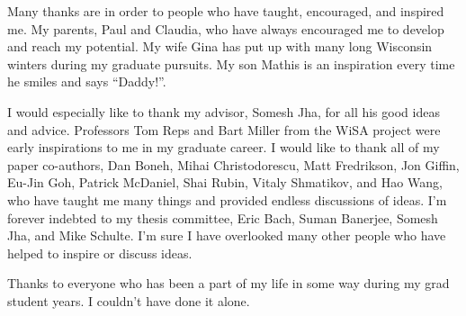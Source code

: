 
Many thanks are in order to people who have taught, encouraged, and
inspired me. My parents, Paul and Claudia, who have always encouraged
me to develop and reach my potential. My wife Gina has put up with
many long Wisconsin winters during my graduate pursuits. My son Mathis
is an inspiration every time he smiles and says {}``Daddy!''.

I would especially like to thank my advisor, Somesh Jha, for all his
good ideas and advice. Professors Tom Reps and Bart Miller from the
WiSA project were early inspirations to me in my graduate career.
I would like to thank all of my paper co-authors, Dan Boneh, Mihai
Christodorescu, Matt Fredrikson, Jon Giffin, Eu-Jin Goh, Patrick McDaniel,
Shai Rubin, Vitaly Shmatikov, and Hao Wang, who have taught
me many things and provided endless discussions of ideas. I'm forever indebted to
my thesis committee, Eric Bach, Suman Banerjee, Somesh Jha, and Mike
Schulte.  I'm sure I have overlooked many other people who have helped to inspire
or discuss ideas.

Thanks to everyone who has been a part of my life in some way during
my grad student years. I couldn't have done it alone.
